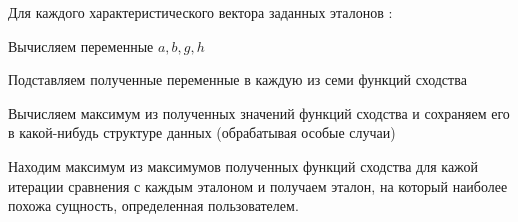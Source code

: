 \documentclass[a4paper,12pt]{article}
\begin{document}
\begin{flushleft}
\begin{list}{}{\leftmargin=3cm}
				\item Для каждого характеристического вектора заданных эталонов :
					\begin{list}{}{\leftmargin=1.5cm}		
						\item Вычисляем переменные ${a,b,g,h}$
						\item Подставляем полученные переменные в каждую из семи функций сходства
						\item Вычисляем максимум из полученных значений функций сходства и сохраняем его в какой-нибудь структуре данных (обрабатывая особые случаи) 
					\end{list}			
				\item Находим максимум из максимумов полученных функций сходства для кажой итерации сравнения с каждым эталоном и получаем эталон, на который наиболее похожа сущность, определенная пользователем.
			\end{list}	 
	\end{flushleft}
\end{document}
